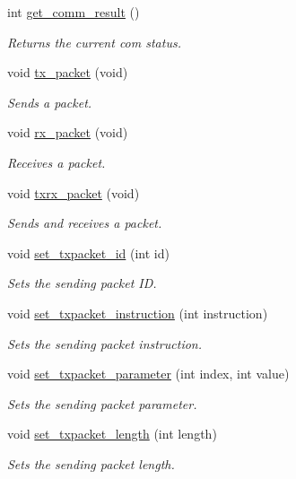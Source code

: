 \begin{DoxyCompactItemize}
int \hyperlink{a00004_ac8440d5d34ae3c4618b28fdbbd748edc}{get\+\_\+comm\+\_\+result} ()
\begin{DoxyCompactList}\small\item\em Returns the current com status. \end{DoxyCompactList}\item 
void \hyperlink{a00004_a479187cd8940c16dd4374eb5be22b888}{tx\+\_\+packet} (void)
\begin{DoxyCompactList}\small\item\em Sends a packet. \end{DoxyCompactList}\item 
void \hyperlink{a00004_aa26d2d2dff768563a1cb1480aa061608}{rx\+\_\+packet} (void)
\begin{DoxyCompactList}\small\item\em Receives a packet. \end{DoxyCompactList}\item 
void \hyperlink{a00004_aebfc569c6b1eb0b98f8c385f0f921fc0}{txrx\+\_\+packet} (void)
\begin{DoxyCompactList}\small\item\em Sends and receives a packet. \end{DoxyCompactList}\item 
void \hyperlink{a00004_a84e24c72c3e5be866f8b28c2e5bd1d95}{set\+\_\+txpacket\+\_\+id} (int id)
\begin{DoxyCompactList}\small\item\em Sets the sending packet I\+D. \end{DoxyCompactList}\item 
void \hyperlink{a00004_a209a43f983f214323b6f0a627d5e8c13}{set\+\_\+txpacket\+\_\+instruction} (int instruction)
\begin{DoxyCompactList}\small\item\em Sets the sending packet instruction. \end{DoxyCompactList}\item 
void \hyperlink{a00004_a2c3d31bbbed70a69918e9972a620384b}{set\+\_\+txpacket\+\_\+parameter} (int index, int value)
\begin{DoxyCompactList}\small\item\em Sets the sending packet parameter. \end{DoxyCompactList}\item 
void \hyperlink{a00004_a829278f48e21c810b172eb8cab3b86de}{set\+\_\+txpacket\+\_\+length} (int length)
\begin{DoxyCompactList}\small\item\em Sets the sending packet length. \end{DoxyCompactList}\item 

\end{DoxyCompactItemize}
